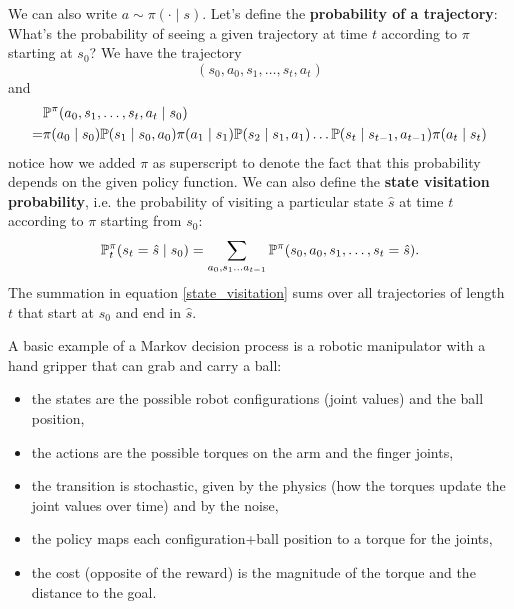 \documentclass[10pt, a4paper]{report}
\begin{document}
We can also write $a\sim \pi(\cdot  \mid  s)$. Let's define the \textbf{probability of a trajectory}: What's the probability of seeing a given trajectory at time $t$ 
according to $\pi$ starting at $s_0$? We have the trajectory\begin{equation}
    (s_0,a_0,s_1,\dots,s_t,a_t)
\end{equation}
and
\begin{align}
    &{\mathbb P}^\pi(a_0,s_1,\dots,s_t,a_t \mid s_0)\\
    =& \pi(a_0 \mid s_0){\mathbb P}(s_1 \mid s_0,a_0)\pi(a_1 \mid s_1){\mathbb P}(s_2 \mid s_1,a_1)\dots 
    {\mathbb P}(s_t \mid s_{t-1},a_{t-1})\pi(a_t \mid s_t)
\end{align}
notice how we added $\pi$ as superscript to denote the fact that this probability depends on the given policy function. We can also define the \textbf{state visitation probability}, i.e. the probability of visiting a particular state $\hat s$ at time $t$ according to $\pi$ starting from $s_0$:\begin{equation}\label{state_visitation}
    {\mathbb P}^\pi_t(s_t=\hat s \mid s_0)=\sum_{a_0,s_1\dots a_{t-1}} {\mathbb P}^\pi(s_0,a_0,s_1,\dots,s_t=\hat s).
\end{equation}
The summation in equation \eqref{state_visitation} sums over all trajectories of length $t$ that start at $s_0$ and end in $\hat{s}$.

A basic example of a Markov decision process is a robotic manipulator with a hand gripper that can grab and carry a ball:\begin{itemize}
    \item the states are the possible robot configurations (joint values) and the ball position,
    \item the actions are the possible torques on the arm and the finger joints,
    \item the transition is stochastic, given by the physics (how the torques update the joint values over time) and by the noise,
    \item the policy maps each configuration+ball position to a torque for the joints,
    \item the cost (opposite of the reward) is the magnitude of the torque and the distance to the goal.
\end{itemize}
\end{document}
